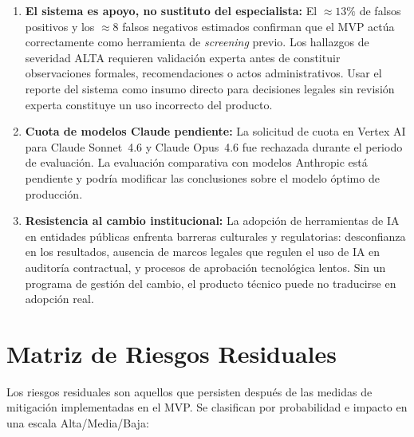 \begin{enumerate}

    \item \textbf{El sistema es apoyo, no sustituto del especialista:}
    El $\approx 13\%$ de falsos positivos y los $\approx 8$ falsos
    negativos estimados confirman que el MVP actúa correctamente como
    herramienta de \textit{screening} previo. Los hallazgos de severidad
    ALTA requieren validación experta antes de constituir observaciones
    formales, recomendaciones o actos administrativos. Usar el reporte
    del sistema como insumo directo para decisiones legales sin revisión
    experta constituye un uso incorrecto del producto.

    \item \textbf{Cuota de modelos Claude pendiente:}
    La solicitud de cuota en Vertex AI para Claude Sonnet~4.6 y
    Claude Opus~4.6 fue rechazada durante el periodo de evaluación.
    La evaluación comparativa con modelos Anthropic está pendiente y
    podría modificar las conclusiones sobre el modelo óptimo de producción.

    \item \textbf{Resistencia al cambio institucional:}
    La adopción de herramientas de IA en entidades públicas enfrenta
    barreras culturales y regulatorias: desconfianza en los resultados,
    ausencia de marcos legales que regulen el uso de IA en auditoría
    contractual, y procesos de aprobación tecnológica lentos. Sin un
    programa de gestión del cambio, el producto técnico puede no
    traducirse en adopción real.

\end{enumerate}

\section*{Matriz de Riesgos Residuales}

Los riesgos residuales son aquellos que persisten después de las medidas
de mitigación implementadas en el MVP. Se clasifican por probabilidad
e impacto en una escala Alta/Media/Baja:

